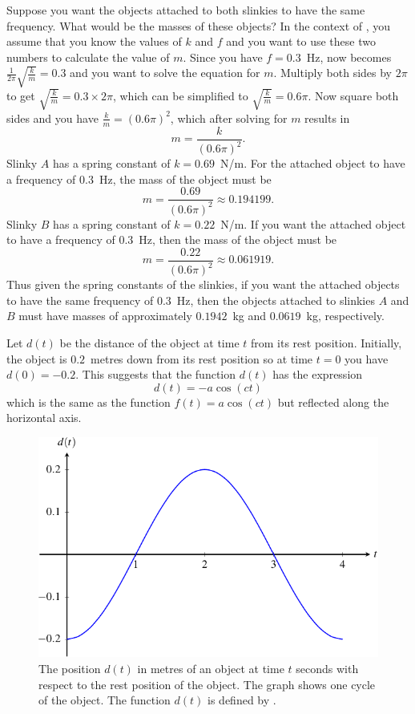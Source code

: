 \documentclass[a4paper,oneside,12pt]{article}
\begin{document}
\begin{problem}
{\begin{solution}
Suppose you want the objects attached to both slinkies to have the
same frequency.  What would be the masses of these objects?  In the
context of , you assume
that you know the values of $k$ and $f$ and you want to use these two
numbers to calculate the value of $m$.  Since you have
$f = 0.3$~Hz,  now
becomes $\frac{1}{2\pi} \sqrt{\frac{k}{m}} = 0.3$ and you want to
solve the equation for $m$.  Multiply both sides by $2\pi$ to get
$\sqrt{\frac{k}{m}} = 0.3 \times 2\pi$, which can be simplified to
$\sqrt{\frac{k}{m}} = 0.6\pi$.  Now square both sides and you have
$\frac{k}{m} = (0.6\pi)^2$, which after solving for $m$ results in
\[
m
=
\frac{k}{(0.6\pi)^2}.
\]
Slinky $A$ has a spring constant of $k = 0.69$~N/m.  For the attached
object to have a frequency of $0.3$~Hz, the mass of the object must be
\[
m
=
\frac{0.69}{(0.6\pi)^2}
\approx
0.194199.
\]
Slinky $B$ has a spring constant of $k = 0.22$~N/m.  If you want the
attached object to have a frequency of $0.3$~Hz, then the mass of the
object must be
\[
m
=
\frac{0.22}{(0.6\pi)^2}
\approx
0.061919.
\]
Thus given the spring constants of the slinkies, if you want the
attached objects to have the same frequency of $0.3$~Hz, then the
objects attached to slinkies $A$ and $B$ must have masses of
approximately $0.1942$~kg and $0.0619$~kg, respectively.

Let $d(t)$ be the distance of the object at time $t$ from its rest
position.  Initially, the object is $0.2$~metres down from its rest
position so at time $t = 0$ you have $d(0) = -0.2$.  This suggests
that the function $d(t)$ has the expression
\[
d(t)
=
-a \cos(ct)
\]
which is the same as the function $f(t) = a \cos(ct)$ but reflected
along the horizontal axis.

\begin{figure}[!htbp]
\centering
\includegraphics[scale=1.1]{image/13/spring-displacement.pdf}
\caption{%
  The position $d(t)$ in metres of an object at time $t$ seconds with
  respect to the rest position of the object.  The graph shows one
  cycle of the object.  The function $d(t)$ is defined by
  .
}
\label{fig:trigonometric:spring_displacement}
\end{figure}


\end{solution}}
\end{problem}
\end{document}
